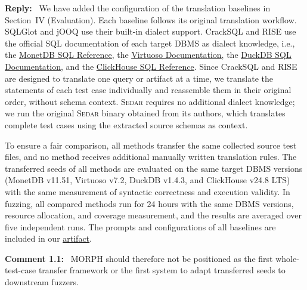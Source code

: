 \documentclass[12pt,letterpaper]{article}
\let\oldhref\href
\renewcommand{\href}[2]{\oldhref{#1}{\uline{#2}}}
\newcommand{\sedar}{\textsc{Sedar}}
\newcommand{\reviewstart}{\par\addvspace{0.85\baselineskip}\Needspace{4\baselineskip}\noindent}
\newcounter{commentanchor}
\newcommand{\reviewcomment}[1]{\reviewstart\renewcommand{\thecommentanchor}{#1}\refstepcounter{commentanchor}\label{comment:#1}\textbf{Comment #1:}\ }
\newcommand{\reply}{\par\nobreak\noindent\textbf{Reply:}\ }
\begin{document}
\reply
We have added the configuration of the translation baselines in Section~IV (Evaluation). Each baseline follows its original translation workflow. SQLGlot and jOOQ use their built-in dialect support. CrackSQL and RISE use the official SQL documentation of each target DBMS as dialect knowledge, i.e., the \href{https://www.monetdb.org/documentation-Aug2024/user-guide/sql-summary/}{MonetDB SQL Reference}, the \href{https://docs.openlinksw.com/virtuoso/}{Virtuoso Documentation}, the \href{https://duckdb.org/docs/sql/introduction}{DuckDB SQL Documentation}, and the \href{https://clickhouse.com/docs/sql-reference}{ClickHouse SQL Reference}. Since CrackSQL and RISE are designed to translate one query or artifact at a time, we translate the statements of each test case individually and reassemble them in their original order, without schema context. \sedar{} requires no additional dialect knowledge; we run the original \sedar{} binary obtained from its authors, which translates complete test cases using the extracted source schemas as context.

To ensure a fair comparison, all methods transfer the same collected source test files, and no method receives additional manually written translation rules. The transferred seeds of all methods are evaluated on the same target DBMS versions (MonetDB v11.51, Virtuoso v7.2, DuckDB v1.4.3, and ClickHouse v24.8 LTS) with the same measurement of syntactic correctness and execution validity. In fuzzing, all compared methods run for 24 hours with the same DBMS versions, resource allocation, and coverage measurement, and the results are averaged over five independent runs. The prompts and configurations of all baselines are included in our \href{https://anonymous.4open.science/r/MorphArtifact-8E44/}{artifact}.

\reviewcomment{1.1} MORPH should therefore not be positioned as the first whole-test-case transfer framework or the first system to adapt transferred seeds to downstream fuzzers.
\end{document}
